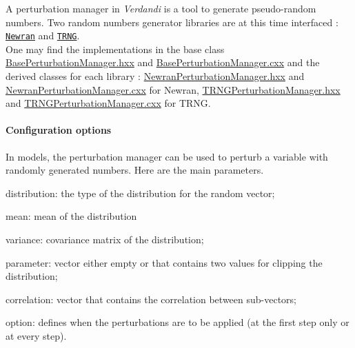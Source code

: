 \documentclass{tufte-book}
\begin{document}
 \-A perturbation manager in \-\emph{Verdandi} is a tool to generate pseudo-\/random numbers. \-Two random numbers generator libraries are at this time interfaced \-: \href{http://www.robertnz.net/nr03doc.htm}{\tt \-Newran} and \href{http://trng.berlios.de/}{\tt \-T\-R\-N\-G}. \\
 \-One may find the implementations in the base class {\ttfamily \hyperlink{_base_perturbation_manager_8hxx_source}{\-Base\-Perturbation\-Manager.\-hxx}} and {\ttfamily \hyperlink{_base_perturbation_manager_8cxx_source}{\-Base\-Perturbation\-Manager.\-cxx}} and the derived classes for each library \-: {\ttfamily \hyperlink{_newran_perturbation_manager_8hxx_source}{\-Newran\-Perturbation\-Manager.\-hxx}} and {\ttfamily \hyperlink{_newran_perturbation_manager_8cxx_source}{\-Newran\-Perturbation\-Manager.\-cxx}} for \-Newran, {\ttfamily \hyperlink{_t_r_n_g_perturbation_manager_8hxx_source}{\-T\-R\-N\-G\-Perturbation\-Manager.\-hxx}} and {\ttfamily \hyperlink{_t_r_n_g_perturbation_manager_8cxx_source}{\-T\-R\-N\-G\-Perturbation\-Manager.\-cxx}} for \-T\-R\-N\-G.\hypertarget{perturbation_manager_configuration}{}\paragraph{\-Configuration options}\label{perturbation_manager_configuration}
\-In models, the perturbation manager can be used to perturb a variable with randomly generated numbers. \-Here are the main parameters.


\begin{DoxyEnumerate}
\item {\ttfamily distribution}\-: the type of the distribution for the random vector;
\item {\ttfamily mean}\-: mean of the distribution
\item {\ttfamily variance}\-: covariance matrix of the distribution;
\item {\ttfamily parameter}\-: vector either empty or that contains two values for clipping the distribution;
\item {\ttfamily correlation}\-: vector that contains the correlation between sub-\/vectors;
\item {\ttfamily option}\-: defines when the perturbations are to be applied (at the first step only or at every step).
\end{DoxyEnumerate}
\end{document}
